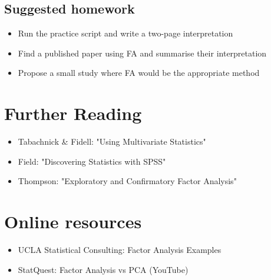 \documentclass[a4paper,11pt]{tufte-book}
\begin{document}
\subsection{Suggested homework}
\begin{itemize}
  \item Run the practice script and write a two-page interpretation
  \item Find a published paper using FA and summarise their interpretation
  \item Propose a small study where FA would be the appropriate method
\end{itemize}

\section{Further Reading}
\begin{itemize}
  \item Tabachnick \& Fidell: "Using Multivariate Statistics"
  \item Field: "Discovering Statistics with SPSS"
  \item Thompson: "Exploratory and Confirmatory Factor Analysis"
\end{itemize}

\section{Online resources}
\begin{itemize}
  \item UCLA Statistical Consulting: Factor Analysis Examples
  \item StatQuest: Factor Analysis vs PCA (YouTube)
\end{itemize}

\end{document}
